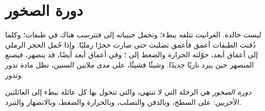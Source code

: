 \section{دورة الصخور}

 ليست خالدة.  الغرانيت تتلفه  ببطء؛ وتحمل 
حبيباته إلى  فتترسب هناك في طبقات؛ وكلما دُفنت الطبقات أعمق فأعمق
تصلبت حتى صارت حجرًا رمليًا. وإذا حُمل الحجر الرملي إلى أعماق أبعد، حوّلته
الحرارة والضغط إلى ؛ وفي أعماق أبعد أيضًا، قد ينصهر، فيصنع
 المنصهر حين يبرد  ناريًا جديدًا. وشيئًا فشيئًا، على مدى ملايين
السنين، تظل مادة  تدور وتدور.

\begin{definition}\label{def:g6:rocks-and-minerals:rock-cycle}
\emph{دورة الصخور} هي الرحلة التي لا تنتهي، والتي
تتحول بها  كل عائلة ببطء إلى  العائلتين الأخريين: 
 على السطح، وبالدفن والتصلب، وبالحرارة والضغط، وبالانصهار
والتبرد.
\end{definition}

